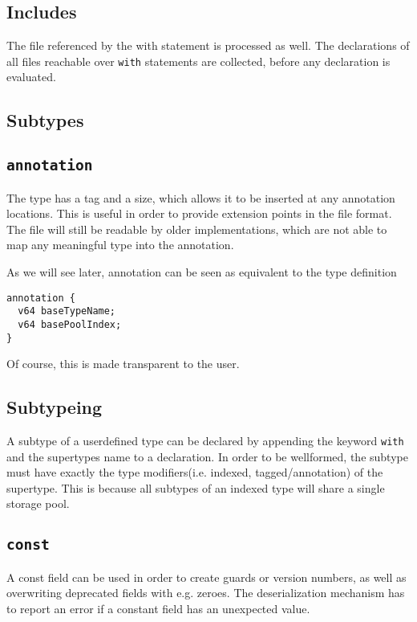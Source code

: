 \documentclass[a4paper,10pt]{article}
\begin{document}
\subsection{Includes}
The file referenced by the with statement is processed as well. The declarations of all files reachable over \texttt{with} statements are collected, before any declaration is evaluated.

\subsection{Subtypes}

\subsection{\texttt{annotation}}
The type has a tag and a size, which allows it to be inserted at any annotation locations. This is useful in order to provide extension points in the file format. The file will still be readable by older implementations, which are not able to map any meaningful type into the annotation.


As we will see later, annotation can be seen as equivalent to the type definition
\begin{verbatim}
annotation {
  v64 baseTypeName;
  v64 basePoolIndex;
}
\end{verbatim}
Of course, this is made transparent to the user.

\subsection{Subtypeing}
A subtype of a userdefined type can be declared by appending the keyword \texttt{with} and the supertypes name to a declaration. In order to be wellformed, the subtype must have exactly the type modifiers(i.e. indexed, tagged/annotation) of the supertype. This is because all subtypes of an indexed type will share a single storage pool.

\subsection{\texttt{const}}
A const field can be used in order to create guards or version numbers, as well as overwriting deprecated fields with e.g. zeroes. The deserialization mechanism has to report an error if a constant field has an unexpected value.
\end{document}

